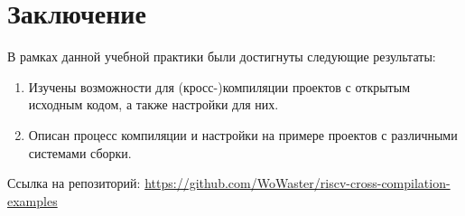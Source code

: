 
\section*{Заключение}
В рамках данной учебной практики были достигнуты следующие
результаты:
\begin{enumerate}
	\item Изучены возможности для (кросс-)компиляции проектов с открытым исходным кодом, а также настройки \ci{} для них.
	\item Описан процесс компиляции и настройки \ci{} на примере проектов с различными системами сборки.
\end{enumerate}

Ссылка на репозиторий: \url{https://github.com/WoWaster/riscv-cross-compilation-examples}

